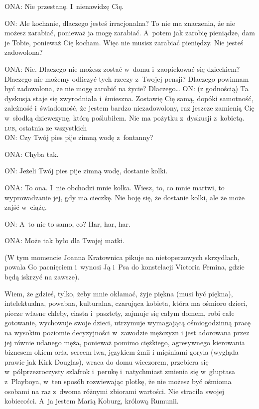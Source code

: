 \documentclass[oneside,polish,12pt,sfheadings]{mwbk}
\begin{document}
ONA: Nie przestanę. I~nienawidzę Cię.

ON: Ale kochanie, dlaczego jesteś irracjonalna? To nie ma znaczenia,
że nie możesz zarabiać, ponieważ ja mogę zarabiać. A~potem jak zarobię
pieniądze, dam je Tobie, ponieważ Cię kocham. Więc nie musisz zarabiać
pieniędzy. Nie jesteś zadowolona?

ONA: Nie. Dlaczego nie możesz zostać w~domu i~zaopiekować się dzieckiem?
Dlaczego nie możemy odliczyć tych rzeczy z~Twojej pensji? Dlaczego
powinnam być zadowolona, że nie mogę zarobić na życie? Dlaczego\ldots
ON: (z godnością) Ta dyskusja staje się zwyrodniała i~śmieszna. Zostawię
Cię samą, dopóki samotność, zależność i~świadomość, że jestem bardzo
niezadowolony, raz jeszcze zamienią Cię w~słodką dziewczynę, którą
poślubiłem. Nie ma pożytku z~dyskusji z~kobietą.\\


\textsc{lub}, ostatnia ze wszystkich\\


ON: Czy Twój pies pije zimną wodę z~fontanny?

ONA: Chyba tak.

ON: Jeżeli Twój pies pije zimną wodę, dostanie kolki.

ONA: To ona. I~nie obchodzi mnie kolka. Wiesz, to, co mnie martwi,
to wyprowadzanie jej, gdy ma cieczkę. Nie boję się, że dostanie kolki,
ale że może zajść w~ciążę.

ON: A~to nie to samo, co? Har, har, har.

ONA: Może tak było dla Twojej matki.

(W tym momencie Joanna Kratownica pikuje na nietoperzowych skrzydłach,
powala Go pacnięciem i~wynosi Ją i~Psa do konstelacji Victoria Femina,
gdzie będą iskrzyć na zawsze).

Wiem, że gdzieś, tylko, żeby mnie okłamać, żyje piękna (musi być piękna),
intelektualna, powabna, kulturalna, czarująca kobieta, która ma ośmioro
dzieci, piecze własne chleby, ciasta i~pasztety, zajmuje się całym
domem, robi całe gotowanie, wychowuje swoje dzieci, utrzymuje wymagającą
ośmiogodzinną pracę na wysokim poziomie decyzyjności w~zawodzie mężczyzn
i jest adorowana przez jej równie udanego męża, ponieważ pomimo ciężkiego,
agresywnego kierowania biznesem okiem orła, sercem lwa, językiem żmii
i mięśniami goryla (wygląda prawie jak Kirk Douglas), wraca do domu
wieczorem, przebiera się w~półprzezroczysty szlafrok i~perukę i~natychmiast
zmienia się w~głuptasa z~Playboya, w~ten sposób rozwiewając plotkę,
że nie możesz być ośmioma osobami na raz z~dwoma różnymi zbiorami
wartości. Nie straciła swojej kobiecości. A~ja jestem Marią Koburg,
królową Rumunii.
\end{document}
